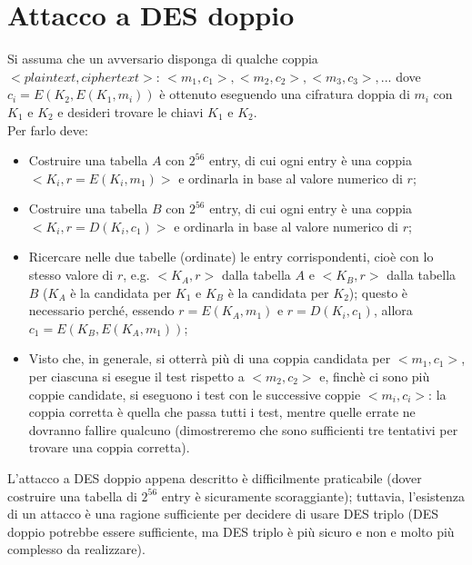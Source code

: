 \section{Attacco a DES doppio}
Si assuma che un avversario disponga di qualche coppia $<plaintext, ciphertext>$: $<m_{1},c_{1}> , <m_{2},c_{2}> , <m_{3},c_{3}> , ...$ dove $c_{i} = E(K_{2}, E(K_{1}, m_{i}))$ è ottenuto eseguendo una cifratura doppia di $m_{i}$ con $K_{1}$ e $K_{2}$ e desideri trovare le chiavi $K_{1}$ e $K_{2}$. \\
Per farlo deve:
\begin{itemize}
\item Costruire una tabella $A$ con $2^56$ entry, di cui ogni entry è una coppia $<K_{i}, r = E(K_{i}, m_{1})>$ e ordinarla in base al valore numerico di $r$;
\item Costruire una tabella $B$ con $2^56$ entry, di cui ogni entry è una coppia $<K_{i}, r = D(K_{i}, c_{1})>$ e ordinarla in base al valore numerico di $r$;
\item Ricercare nelle due tabelle (ordinate) le entry corrispondenti, cioè con lo stesso valore di $r$, e.g. $<K_{A},r>$ dalla tabella $A$ e $<K_{B},r>$ dalla tabella $B$ ($K_{A}$ è la candidata per $K_{1}$ e $K_{B}$ è la candidata per $K_{2}$); questo è necessario perché, essendo $r = E(K_{A}, m_{1})$ e $r = D(K_{i}, c_{1})$, allora $c_{1} = E(K_{B}, E(K_{A}, m_{1}))$;
\item Visto che, in generale, si otterrà più di una coppia candidata per $<m_{1},c_{1}>$, per ciascuna si esegue il test rispetto a $<m_{2},c_{2}>$ e, finchè ci sono più coppie candidate, si eseguono i test con le successive coppie $<m_{i},c_{i}>$: la coppia corretta è quella che passa tutti i test, mentre quelle errate ne dovranno fallire qualcuno (dimostreremo che sono sufficienti tre tentativi per trovare una coppia corretta). 
\end{itemize} 
L'attacco a DES doppio appena descritto è difficilmente praticabile (dover costruire una tabella di $2^56$ entry è sicuramente scoraggiante); tuttavia, l'esistenza di un attacco è una ragione sufficiente per decidere di usare DES triplo (DES doppio potrebbe essere sufficiente, ma DES triplo è più sicuro e non e molto più complesso da realizzare).
